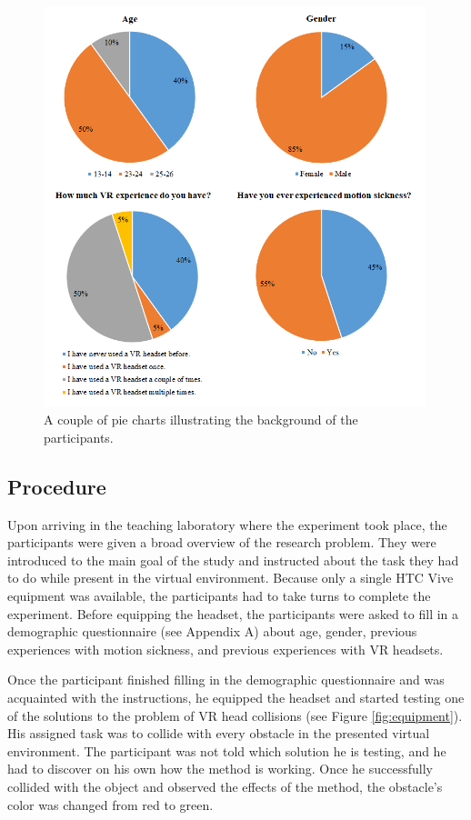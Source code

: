 \begin{figure}[th]
\centering
\includegraphics[width=0.99\textwidth]{img/demographic_charts.png}
\caption{A couple of pie charts illustrating the background of the participants.}
\label{fig:demographic_charts}
\end{figure}

\subsection{Procedure}

Upon arriving in the teaching laboratory where the experiment took place, the participants were given a broad overview of the research problem. They were introduced to the main goal of the study and instructed about the task they had to do while present in the virtual environment. Because only a single HTC Vive equipment was available, the participants had to take turns to complete the experiment. Before equipping the headset, the participants were asked to fill in a demographic questionnaire (see Appendix A) about age, gender, previous experiences with motion sickness, and previous experiences with VR headsets.

Once the participant finished filling in the demographic questionnaire and was acquainted with the instructions, he equipped the headset and started testing one of the solutions to the problem of VR head collisions (see Figure \ref{fig:equipment}). His assigned task was to collide with every obstacle in the presented virtual environment. The participant was not told which solution he is testing, and he had to discover on his own how the method is working. Once he successfully collided with the object and observed the effects of the method, the obstacle's color was changed from red to green. 

